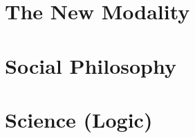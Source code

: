 \documentclass[10pt,twoside,draft]{memoir}
\begin{document}
\part{The New Modality}









\part{Social Philosophy}




\part{Science (Logic)}


\end{document}

